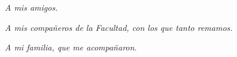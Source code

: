 \hfill \textit{A mis amigos.}

\hfill \textit{A mis compañeros de la Facultad, con los que tanto remamos.}

\hfill \textit{A mi familia, que me acompañaron.}